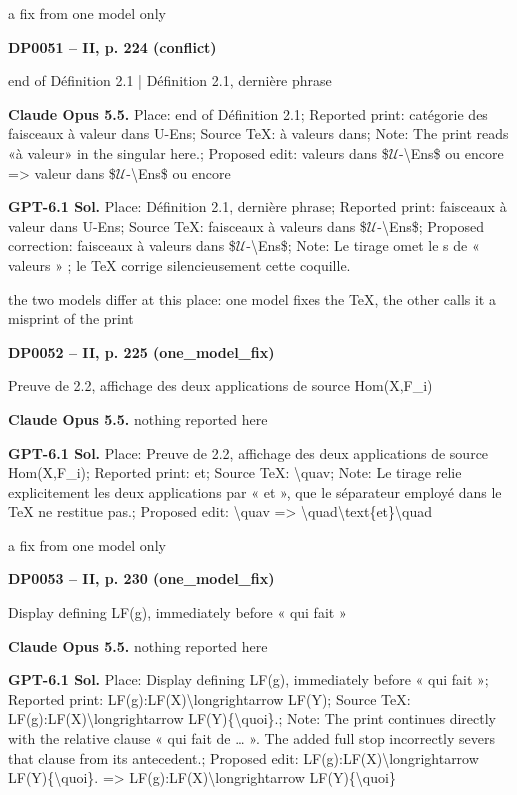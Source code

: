 a fix from one model only\par
\par\noindent\hypertarget{DP0051}{}\textbf{DP0051 -- II, p. 224 (conflict)}\par
end of Définition 2.1 | Définition 2.1, dernière phrase\par
\textbf{Claude Opus 5.5.} Place: end of Définition 2.1; Reported print: catégorie des faisceaux à valeur dans U-Ens; Source TeX: à valeurs dans; Note: The print reads «à valeur» in the singular here.; Proposed edit: valeurs dans \$\ensuremath{𝒰}-\textbackslash{}Ens\$ ou encore =\allowbreak > valeur dans \$\ensuremath{𝒰}-\textbackslash{}Ens\$ ou encore\par
\textbf{GPT-6.1 Sol.} Place: Définition 2.1, dernière phrase; Reported print: faisceaux à valeur dans U-Ens; Source TeX: faisceaux à valeurs dans \$\ensuremath{𝒰}-\textbackslash{}Ens\$; Proposed correction: faisceaux à valeurs dans \$\ensuremath{𝒰}-\textbackslash{}Ens\$; Note: Le tirage omet le s de « valeurs » ; le TeX corrige silencieusement cette coquille.\par
the two models differ at this place: one model fixes the TeX, the other calls it a misprint of the print\par
\par\noindent\hypertarget{DP0052}{}\textbf{DP0052 -- II, p. 225 (one\_model\_fix)}\par
Preuve de 2.2, affichage des deux applications de source Hom(X,F\_i)\par
\textbf{Claude Opus 5.5.} nothing reported here\par
\textbf{GPT-6.1 Sol.} Place: Preuve de 2.2, affichage des deux applications de source Hom(X,F\_i); Reported print: et; Source TeX: \textbackslash{}quav; Note: Le tirage relie explicitement les deux applications par « et », que le séparateur employé dans le TeX ne restitue pas.; Proposed edit: \textbackslash{}quav =\allowbreak > \textbackslash{}quad\textbackslash{}text\{et\}\textbackslash{}quad\par
a fix from one model only\par
\par\noindent\hypertarget{DP0053}{}\textbf{DP0053 -- II, p. 230 (one\_model\_fix)}\par
Display defining LF(g), immediately before « qui fait »\par
\textbf{Claude Opus 5.5.} nothing reported here\par
\textbf{GPT-6.1 Sol.} Place: Display defining LF(g), immediately before « qui fait »; Reported print: LF(g):LF(X)\textbackslash{}longrightarrow LF(Y); Source TeX: LF(g):LF(X)\textbackslash{}longrightarrow LF(Y)\{\textbackslash{}quoi\}.; Note: The print continues directly with the relative clause « qui fait de … ». The added full stop incorrectly severs that clause from its antecedent.; Proposed edit: LF(g):LF(X)\textbackslash{}longrightarrow LF(Y)\{\textbackslash{}quoi\}. =\allowbreak > LF(g):LF(X)\textbackslash{}longrightarrow LF(Y)\{\textbackslash{}quoi\}\par
